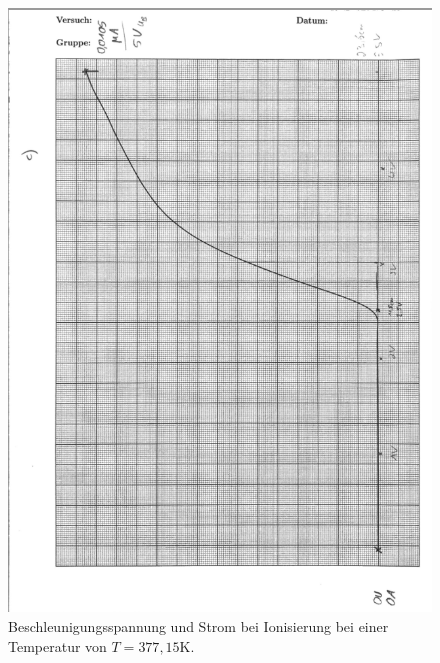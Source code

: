 \begin{figure}[H]
  \centering
  \includegraphics{c.PNG}
  \caption{Beschleunigungsspannung und Strom bei Ionisierung bei einer Temperatur von $T= 377,15\si{\K}$.}
  \label{fig:plot}
\end{figure}
